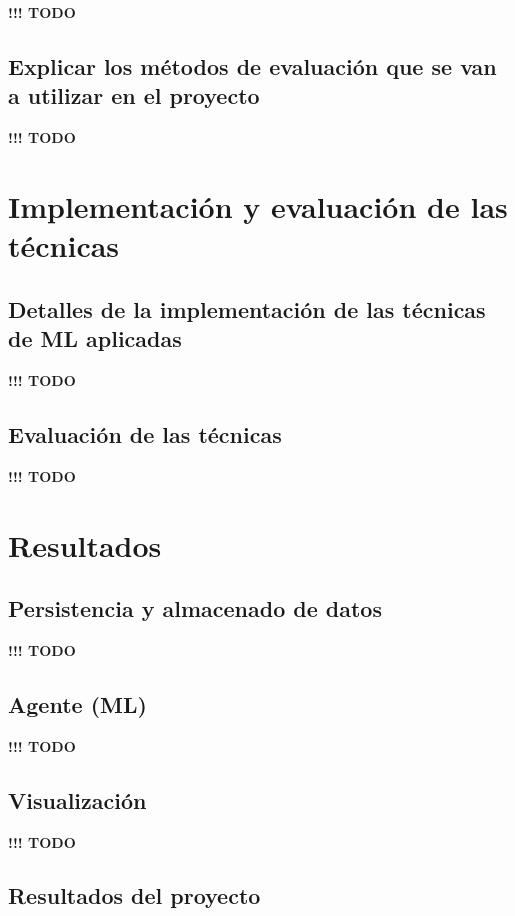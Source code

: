 \documentclass[]{article}
\begin{document}
\textbf{!!! TODO}

\subsection{Explicar los métodos de evaluación que se van a utilizar en el proyecto}

\textbf{!!! TODO}


\section{Implementación y evaluación de las técnicas}

\subsection{Detalles de la implementación de las técnicas de ML aplicadas}

\textbf{!!! TODO}

\subsection{Evaluación de las técnicas}

\textbf{!!! TODO}


\section{Resultados}

\subsection{Persistencia y almacenado de datos}

\textbf{!!! TODO}

\subsection{Agente (ML)}

\textbf{!!! TODO}

\subsection{Visualización}

\textbf{!!! TODO}

\subsection{Resultados del proyecto}
\end{document}
